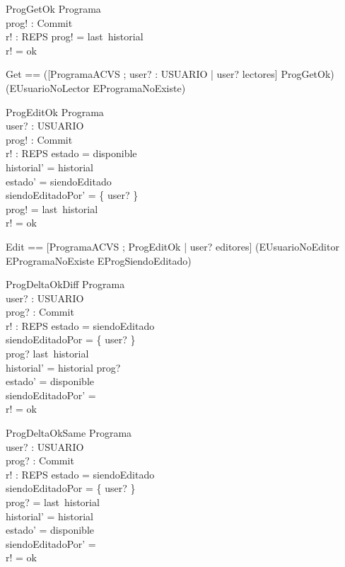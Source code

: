 \documentclass[11pt]{article}
\begin{document}
  \begin{schema}{ProgGetOk}
  \Xi Programa \\
  prog! : Commit \\
  r! : REPS
  \where
  prog! = last~historial \\
  r! = ok
  \end{schema}
  
  \begin{zed}
  Get == ([ProgramaACVS ; user? : USUARIO | user? \in lectores] \land ProgGetOk) \lor (EUsuarioNoLector \lor EProgramaNoExiste)
  \end{zed}
  
  \begin{schema}{ProgEditOk}
  \Delta Programa \\
  user? : USUARIO \\
  prog! : Commit \\
  r! : REPS
  \where
  estado = disponible \\
  historial' = historial \\
  estado' = siendoEditado \\
  siendoEditadoPor' = \{ user? \} \\
  prog! = last~historial \\
  r! = ok
  \end{schema}
  
  \begin{zed}
  Edit == [ProgramaACVS ; ProgEditOk | user? \in editores] \lor (EUsuarioNoEditor \lor EProgramaNoExiste \lor EProgSiendoEditado)
  \end{zed}
  
  \begin{schema}{ProgDeltaOkDiff}
  \Delta Programa \\
  user? : USUARIO \\
  prog? : Commit \\
  r! : REPS 
  \where
  estado = siendoEditado \\
  siendoEditadoPor = \{ user? \} \\
  prog? \neq last~historial \\
  historial' = historial \cat \langle prog? \rangle \\
  estado' = disponible \\
  siendoEditadoPor' = \emptyset \\
  r! = ok
  \end{schema}
  
  \begin{schema}{ProgDeltaOkSame}
  \Delta Programa \\
  user? : USUARIO \\
  prog? : Commit \\
  r! : REPS 
  \where
  estado = siendoEditado \\
  siendoEditadoPor = \{ user? \} \\
  prog? = last~historial \\
  historial' = historial \\
  estado' = disponible \\
  siendoEditadoPor' = \emptyset \\
  r! = ok
  \end{schema}
  
\end{document}
